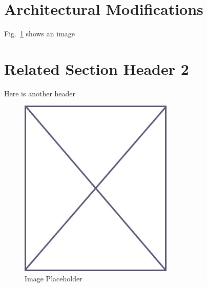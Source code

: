 
\section{Architectural Modifications}
\label{sec:related_arch_mod}

Fig.~\ref{fig:placeholder_related} shows an image

\section{Related Section Header 2}
\label{sec:related_sec_2}

Here is another header

\begin{figure}
\begin{center}
\vspace{-32pt}
\includegraphics[scale=.45]{figs/placeholder}
\end{center}
\vspace{-12pt}
\caption{Image Placeholder}
\label{fig:placeholder_related}
\end{figure}

